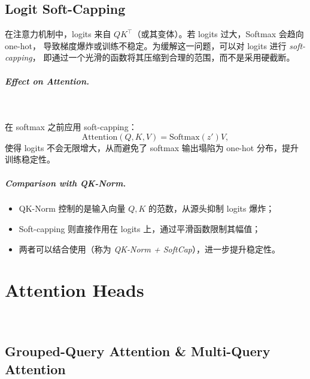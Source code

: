 \subsection{Logit Soft-Capping}

在注意力机制中，logits 来自 $QK^\top$（或其变体）。若 logits 过大，Softmax 会趋向 one-hot，
导致梯度爆炸或训练不稳定。为缓解这一问题，可以对 logits 进行 \emph{soft-capping}，
即通过一个光滑的函数将其压缩到合理的范围，而不是采用硬截断。





\subparagraph{Effect on Attention.}~{}

在 softmax 之前应用 soft-capping：
\[
    \mathrm{Attention}(Q,K,V) = \mathrm{Softmax}(z')V,
\]
使得 logits 不会无限增大，从而避免了 softmax 输出塌陷为 one-hot 分布，提升训练稳定性。

\subparagraph{Comparison with QK-Norm.}
\begin{itemize}
    \item QK-Norm 控制的是输入向量 $Q, K$ 的范数，从源头抑制 logits 爆炸；
    \item Soft-capping 则直接作用在 logits 上，通过平滑函数限制其幅值；
    \item 两者可以结合使用（称为 \emph{QK-Norm + SoftCap}），进一步提升稳定性。
\end{itemize}




\clearpage
{\chaptoc\noindent\begin{minipage}[inner sep=0,outer sep=0]{0.9\linewidth}\section{Attention Heads}\end{minipage}}
\\

\subsection{Grouped-Query Attention \& Multi-Query Attention}


